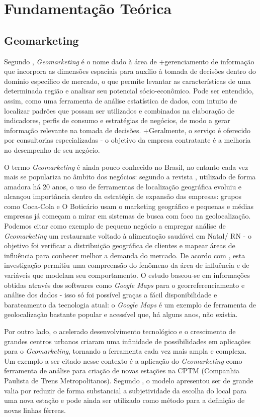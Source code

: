 
\chapter{Fundamentação Teórica} \label{fundamentacao-teorica}

\section{Geomarketing}
\label{Geom}
Segundo , \emph{Geomarketing} é o nome dado à área de
+gerenciamento de informação que incorpora as dimensões espaciais para auxílio à
tomada de decisões dentro do domínio específico de mercado, o que permite
levantar as características de uma determinada região e analisar seu potencial
sócio-econômico. Pode ser entendido, assim, como uma ferramenta de análise
estatística de dados, com intuito de localizar padrões que possam ser utilizados
e combinados na elaboração de indicadores, perfis de consumo e estratégias de
negócios, de modo a gerar informação relevante na tomada de decisões.
+Geralmente, o serviço é oferecido por consultorias especializadas - o  objetivo
da empresa  contratante é a melhoria no desempenho de seu negócio.

O termo \emph{Geomarketing} é ainda pouco conhecido no Brasil, no entanto cada
vez mais se populariza no âmbito dos negócios: segundo a revista
, utilizado de forma amadora há 20 anos, o uso de ferramentas
de localização geográfica evoluiu e alcançou importância dentro da estratégia de
expansão das empresas: grupos como Coca-Cola e O Boticário usam o marketing
geográfico e pequenas e médias empresas já começam a mirar em sistemas de busca
com foco na geolocalização. Podemos citar como exemplo de pequeno negócio a
empregar análise de \emph{Geomarketing} um restaurante voltado à alimentação saudável em Natal/ RN - o objetivo foi verificar a distribuição geográfica de clientes e
mapear áreas de influência para conhecer melhor a demanda do mercado. De acordo
com , esta investigação permitiu uma compreensão do
fenômeno da área de influência e de variáveis que modelam seu comportamento. O
estudo baseou-se em informações obtidas através dos softwares como \emph{Google
Maps} para o georreferenciamento e análise dos dados - isso só foi possível
graças a fácil disponibilidade e barateamento da tecnologia atual: o
\emph{Google Maps} é um exemplo de ferramenta de geolocalização bastante popular
e acessível que, há alguns anos, não existia.

Por outro lado, o acelerado desenvolvimento tecnológico e o crescimento de
grandes centros urbanos criaram uma infinidade de possibilidades em aplicações
para o \emph{Geomarketing}, tornando a ferramenta cada vez mais ampla e
complexa. Um exemplo a ser citado nesse contexto é a aplicação do
\emph{Geomarketing} como ferramenta de análise para criação de novas estações na
CPTM (Companhia Paulista de Trens Metropolitanos). Segundo
, o modelo apresentou ser de grande valia por reduzir de
forma substancial a subjetividade da escolha do local para uma nova estação e
pode ainda ser utilizado como método para a definição de novas linhas férreas.


